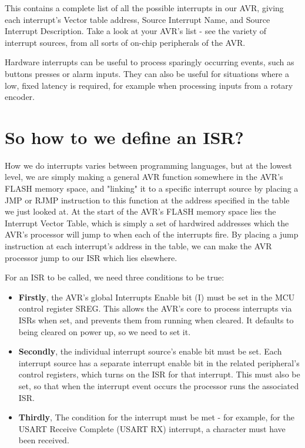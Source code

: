 \documentclass[a4paper,oneside]{book}
\begin{document}
This contains a complete list of all the possible interrupts in our AVR, giving each interrupt's Vector table address, Source Interrupt Name, and Source Interrupt Description. Take a look at your AVR's list - see the variety of interrupt sources, from all sorts of on-chip peripherals of the AVR.

Hardware interrupts can be useful to process sparingly occurring events, such as buttons presses or alarm inputs. They can also be useful for situations where a low, fixed latency is required, for example when processing inputs from a rotary encoder.


\label{chp:DefISR}
\chapter{So how to we define an ISR?}

How we do interrupts varies between programming languages, but at the lowest level, we are simply making a general AVR function somewhere in the AVR's FLASH memory space, and "linking" it to a specific interrupt source by placing a JMP or RJMP instruction to this function at the address specified in the table we just looked at. At the start of the AVR's FLASH memory space lies the Interrupt Vector Table, which is simply a set of hardwired addresses which the AVR's processor will jump to when each of the interrupts fire. By placing a jump instruction at each interrupt's address in the table, we can make the AVR processor jump to our ISR which lies elsewhere.

For an ISR to be called, we need three conditions to be true: 

\begin{itemize}
\item \textbf{Firstly}, the AVR's global Interrupts Enable bit (I) must be set in the MCU control register SREG. This allows the AVR's core to process interrupts via ISRs when set, and prevents them from running when cleared. It defaults to being cleared on power up, so we need to set it.

\item \textbf{Secondly}, the individual interrupt source's enable bit must be set. Each interrupt source has a separate interrupt enable bit in the related peripheral's control registers, which turns on the ISR for that interrupt. This must also be set, so that when the interrupt event occurs the processor runs the associated ISR.

\item \textbf{Thirdly}, The condition for the interrupt must be met - for example, for the USART Receive Complete (USART RX) interrupt, a character must have been received. 
\end{itemize}
\end{document}
